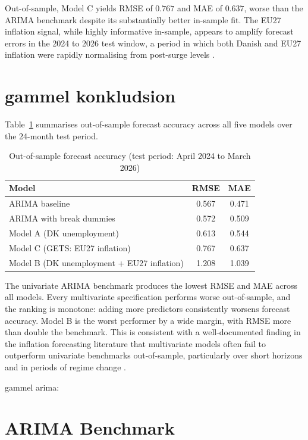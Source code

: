 Out-of-sample, Model C yields RMSE of $0.767$ and MAE of $0.637$, worse than 
the ARIMA benchmark despite its substantially better in-sample fit. The EU27 
inflation signal, while highly informative in-sample, appears to amplify 
forecast errors in the 2024 to 2026 test window, a period in which both Danish 
and EU27 inflation were rapidly normalising from post-surge levels 
\parencite{clements2002}.


\section{gammel konkludsion}

Table~\ref{tab:model_comparison} summarises out-of-sample forecast accuracy 
across all five models over the 24-month test period.

\begin{table}[H]
\centering
\caption{Out-of-sample forecast accuracy (test period: April 2024 to March 2026)}
\begin{tabular}{lcc}
\hline
Model & RMSE & MAE \\
\hline
ARIMA baseline                           & 0.567 & 0.471 \\
ARIMA with break dummies                 & 0.572 & 0.509 \\
Model A (DK unemployment)                & 0.613 & 0.544 \\
Model C (GETS: EU27 inflation)           & 0.767 & 0.637 \\
Model B (DK unemployment + EU27 inflation) & 1.208 & 1.039 \\
\hline
\end{tabular}
\label{tab:model_comparison}
\end{table}

The univariate ARIMA benchmark produces the lowest RMSE and MAE across all 
models. Every multivariate specification performs worse out-of-sample, and the 
ranking is monotone: adding more predictors consistently worsens forecast 
accuracy. Model B is the worst performer by a wide margin, with RMSE more than 
double the benchmark. This is consistent with a well-documented finding in the 
inflation forecasting literature that multivariate models often fail to 
outperform univariate benchmarks out-of-sample, particularly over short horizons 
and in periods of regime change \parencite{stock_watson_2008}.


gammel arima:

\section{ARIMA Benchmark}

